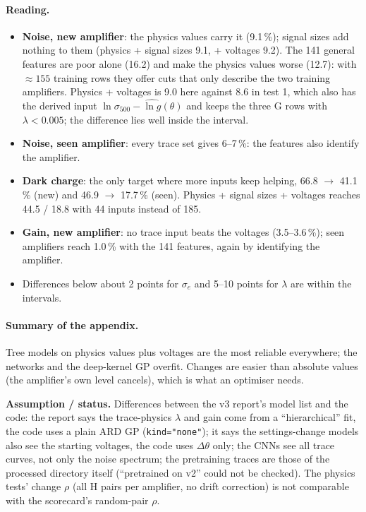\documentclass[10pt,a4paper]{article}
\newcommand{\code}[1]{\texttt{\small #1}}
\newcommand{\caveat}[1]{\par\smallskip\noindent\colorbox{orange!10}{\parbox{\dimexpr\linewidth-2\fboxsep}{\small\textbf{Assumption / status.} #1}}\par\smallskip}
\begin{document}
\paragraph{Reading.}
\begin{itemize}
\item \textbf{Noise, new amplifier}: the physics values carry it (9.1\,\%); signal sizes add nothing to them
  (physics + signal sizes 9.1, + voltages 9.2). The 141 general features are poor alone (16.2) and make the physics values worse
  (12.7): with $\approx155$ training rows they offer cuts that only describe the two training amplifiers.
  Physics + voltages is 9.0 here against 8.6 in test 1, which also has the derived input
  $\ln\sigma_{500}-\widehat{\ln g}(\theta)$ and keeps the three G rows with $\lambda<0.005$; the difference lies well inside the interval.
\item \textbf{Noise, seen amplifier}: every trace set gives 6--7\,\%: the features also identify the amplifier.
\item \textbf{Dark charge}: the only target where more inputs keep helping, 66.8 $\to$ 41.1\,\% (new) and 46.9 $\to$ 17.7\,\% (seen).
  Physics + signal sizes + voltages reaches 44.5 / 18.8 with 44 inputs instead of 185.
\item \textbf{Gain, new amplifier}: no trace input beats the voltages (3.5--3.6\,\%); seen amplifiers reach 1.0\,\% with the 141 features,
  again by identifying the amplifier.
\item Differences below about 2 points for $\sigma_e$ and 5--10 points for $\lambda$ are within the intervals.
\end{itemize}

\paragraph{Summary of the appendix.} Tree models on physics values plus voltages are the most reliable everywhere; the
networks and the deep-kernel GP overfit. Changes are easier than absolute values (the amplifier's own level cancels), which is
what an optimiser needs.

\caveat{Differences between the v3 report's model list and the code: the report says the trace-physics $\lambda$ and gain come from
a ``hierarchical'' fit, the code uses a plain ARD GP (\code{kind="none"}); it says the settings-change models also see the
starting voltages, the code uses $\Delta\theta$ only; the CNNs see all trace curves, not only the noise spectrum; the
pretraining traces are those of the processed directory itself (``pretrained on v2'' could not be checked). The physics tests'
change $\rho$ (all H pairs per amplifier, no drift correction) is not comparable with the scorecard's random-pair $\rho$.}
\end{document}
